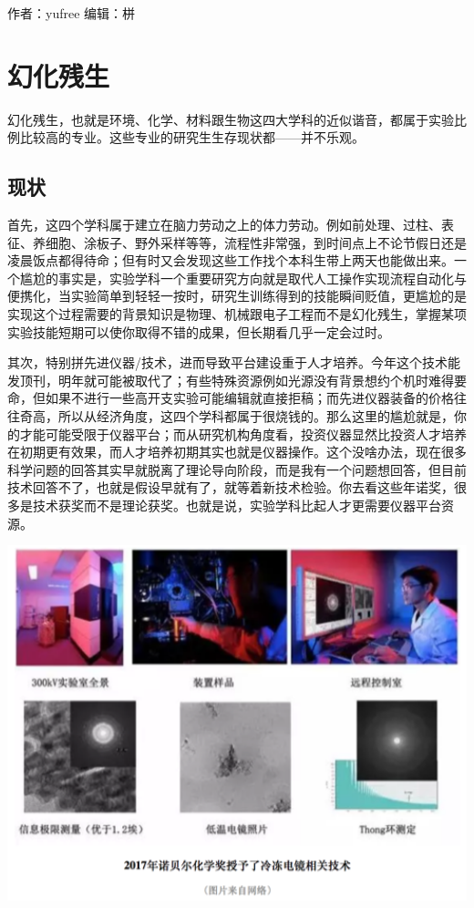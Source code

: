 \documentclass[]{book}
\begin{document}
作者：yufree 编辑：栟

\section{幻化残生}

幻化残生，也就是环境、化学、材料跟生物这四大学科的近似谐音，都属于实验比例比较高的专业。这些专业的研究生生存现状都------并不乐观。

\subsection{现状}

首先，这四个学科属于建立在脑力劳动之上的体力劳动。例如前处理、过柱、表征、养细胞、涂板子、野外采样等等，流程性非常强，到时间点上不论节假日还是凌晨饭点都得待命；但有时又会发现这些工作找个本科生带上两天也能做出来。一个尴尬的事实是，实验学科一个重要研究方向就是取代人工操作实现流程自动化与便携化，当实验简单到轻轻一按时，研究生训练得到的技能瞬间贬值，更尴尬的是实现这个过程需要的背景知识是物理、机械跟电子工程而不是幻化残生，掌握某项实验技能短期可以使你取得不错的成果，但长期看几乎一定会过时。

其次，特别拼先进仪器/技术，进而导致平台建设重于人才培养。今年这个技术能发顶刊，明年就可能被取代了；有些特殊资源例如光源没有背景想约个机时难得要命，但如果不进行一些高开支实验可能编辑就直接拒稿；而先进仪器装备的价格往往奇高，所以从经济角度，这四个学科都属于很烧钱的。那么这里的尴尬就是，你的才能可能受限于仪器平台；而从研究机构角度看，投资仪器显然比投资人才培养在初期更有效果，而人才培养初期其实也就是仪器操作。这个没啥办法，现在很多科学问题的回答其实早就脱离了理论导向阶段，而是我有一个问题想回答，但目前技术回答不了，也就是假设早就有了，就等着新技术检验。你去看这些年诺奖，很多是技术获奖而不是理论获奖。也就是说，实验学科比起人才更需要仪器平台资源。

\includegraphics[width=6.67in]{images/hhcs1}
\end{document}
